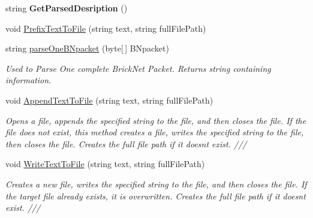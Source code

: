 \begin{DoxyCompactItemize}
string {\bfseries Get\+Parsed\+Desription} ()
\item 
void \mbox{\hyperlink{class_b_n_a30_1_1_net_anal_b_n_a34c16bd9ddcea03cdf6f492c95dbd9b1}{Prefix\+Text\+To\+File}} (string text, string full\+File\+Path)
\item 
string \mbox{\hyperlink{class_b_n_a30_1_1_net_anal_b_n_a8ce0978911afb66e424bb7c5d201ee7e}{parse\+One\+B\+Npacket}} (byte\mbox{[}$\,$\mbox{]} B\+Npacket)
\begin{DoxyCompactList}\small\item\em Used to Parse One complete Brick\+Net Packet. Returns string containing information. \end{DoxyCompactList}\item 
void \mbox{\hyperlink{class_b_n_a30_1_1_net_anal_b_n_acbc0bcad46138f72d5cc61bce3dae2ac}{Append\+Text\+To\+File}} (string text, string full\+File\+Path)
\begin{DoxyCompactList}\small\item\em Opens a file, appends the specified string to the file, and then closes the file. If the file does not exist, this method creates a file, writes the specified string to the file, then closes the file. Creates the full file path if it doesn\textquotesingle{}t exist. /// \end{DoxyCompactList}\item 
void \mbox{\hyperlink{class_b_n_a30_1_1_net_anal_b_n_a16017636e9d3a76d33def5f22454953c}{Write\+Text\+To\+File}} (string text, string full\+File\+Path)
\begin{DoxyCompactList}\small\item\em Creates a new file, writes the specified string to the file, and then closes the file. If the target file already exists, it is overwritten. Creates the full file path if it doesn\textquotesingle{}t exist. /// \end{DoxyCompactList}\end{DoxyCompactItemize}
